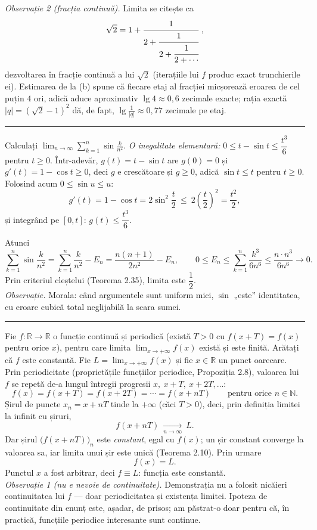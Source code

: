 \emph{Observație 2 (fracția continuă).} Limita se citește ca
\[ \sqrt2=1+\cfrac{1}{2+\cfrac{1}{2+\cfrac{1}{2+\cdots}}}\ , \]
dezvoltarea în fracție continuă a lui $\sqrt2$ (iterațiile lui $f$ produc exact trunchierile ei). Estimarea de la (b) spune că fiecare etaj al fracției micșorează eroarea de cel puțin $4$ ori, adică aduce aproximativ $\lg4\approx0{,}6$ zecimale exacte; rația exactă $|q|=(\sqrt2-1)^2$ dă, de fapt, $\lg\frac{1}{|q|}\approx0{,}77$ zecimale pe etaj.
\vspace{1mm}\hrule

Calculați $\displaystyle\lim_{n\to\infty}\sum_{k=1}^{n}\sin\frac{k}{n^2}$.
\sol \emph{O inegalitate elementară:} $0\le t-\sin t\le\dfrac{t^3}{6}$ pentru $t\ge0$. Într-adevăr, $g(t)=t-\sin t$ are $g(0)=0$ și $g'(t)=1-\cos t\ge0$, deci $g$ e crescătoare și $g\ge0$, adică $\sin t\le t$ pentru $t\ge0$. Folosind acum $0\le\sin u\le u$:
\[ g'(t)=1-\cos t=2\sin^2\frac t2\ \le\ 2\left(\frac t2\right)^2=\frac{t^2}{2}, \]
și integrând pe $[0,t]$: $g(t)\le\dfrac{t^3}{6}$.

Atunci
\[ \sum_{k=1}^n\sin\frac{k}{n^2}=\sum_{k=1}^n\frac{k}{n^2}-E_n=\frac{n(n+1)}{2n^2}-E_n,\qquad 0\le E_n\le\sum_{k=1}^n\frac{k^3}{6n^6}\le\frac{n\cdot n^3}{6n^6}\to0 . \]
Prin criteriul cleștelui (Teorema 2.35), limita este $\dfrac12$.\\[2pt]
\emph{Observație.} Morala: când argumentele sunt uniform mici, $\sin$ „este'' identitatea, cu eroare cubică total neglijabilă la scara sumei.
\vspace{1mm}\hrule

Fie $f:\mathbb{R}\to\mathbb{R}$ o funcție continuă și periodică (există $T>0$ cu $f(x+T)=f(x)$ pentru orice $x$), pentru care limita $\displaystyle\lim_{x\to+\infty}f(x)$ există și este finită. Arătați că $f$ este constantă.
\sol Fie $L=\displaystyle\lim_{x\to+\infty}f(x)$ și fie $x\in\mathbb{R}$ un punct oarecare. Prin periodicitate (proprietățile funcțiilor periodice, Propoziția 2.8), valoarea lui $f$ se repetă de-a lungul întregii progresii $x,\ x+T,\ x+2T,\dots$:
\[ f(x)=f(x+T)=f(x+2T)=\cdots=f(x+nT)\qquad\text{pentru orice }n\in\mathbb{N} . \]
Șirul de puncte $x_{n}=x+nT$ tinde la $+\infty$ (căci $T>0$), deci, prin definiția limitei la infinit cu șiruri,
\[ f(x+nT)\ \xrightarrow[n\to\infty]{}\ L . \]
Dar șirul $\bigl(f(x+nT)\bigr)_{n}$ este \emph{constant}, egal cu $f(x)$; un șir constant converge la valoarea sa, iar limita unui șir este unică (Teorema 2.10). Prin urmare
\[ f(x)=L . \]
Punctul $x$ a fost arbitrar, deci $f\equiv L$: funcția este constantă.\\[2pt]
\emph{Observație 1 (nu e nevoie de continuitate).} Demonstrația nu a folosit nicăieri continuitatea lui $f$ --- doar periodicitatea și existența limitei. Ipoteza de continuitate din enunț este, așadar, de prisos; am păstrat-o doar pentru că, în practică, funcțiile periodice interesante sunt continue.

